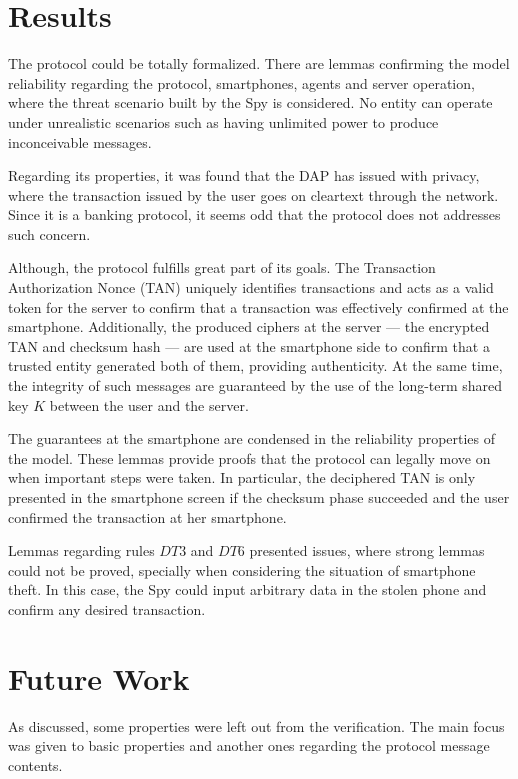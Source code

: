 \section{Results}
The protocol could be totally formalized. There are lemmas confirming the model reliability regarding the protocol, smartphones, agents and server operation, where the threat scenario built by the Spy is considered. No entity can operate under unrealistic scenarios such as having unlimited power to produce inconceivable messages.

Regarding its properties, it was found that the DAP has issued with privacy, where the transaction issued by the user goes on cleartext through the network. Since it is a banking protocol, it seems odd that the protocol does not addresses such concern.

Although, the protocol fulfills great part of its goals. The Transaction Authorization Nonce (TAN) uniquely identifies transactions and acts as a valid token for the server to confirm that a transaction was effectively confirmed at the smartphone. Additionally, the produced ciphers at the server --- the encrypted TAN and checksum hash --- are used at the smartphone side to confirm that a trusted entity generated both of them, providing authenticity. At the same time, the integrity of such messages are guaranteed by the use of the long-term shared key \(K\) between the user and the server.

The guarantees at the smartphone are condensed in the reliability properties of the model. These lemmas provide proofs that the protocol can legally move on when important steps were taken. In particular, the deciphered TAN is only presented in the smartphone screen if the checksum phase succeeded and the user confirmed the transaction at her smartphone.

Lemmas regarding rules $DT3$ and $DT6$ presented issues, where strong lemmas could not be proved, specially when considering the situation of smartphone theft. In this case, the Spy could input arbitrary data in the stolen phone and confirm any desired transaction.

\section{Future Work}
As discussed, some properties were left out from the verification. The main focus was given to basic properties and another ones regarding the protocol message contents.

